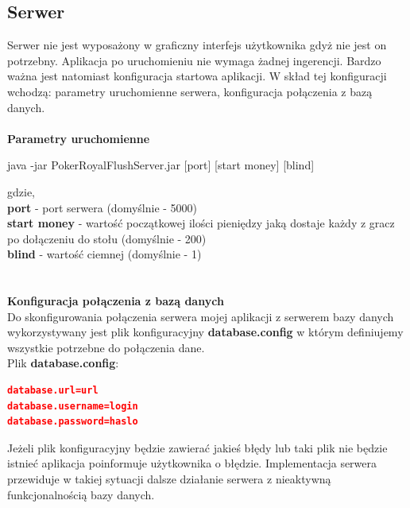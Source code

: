 \documentclass{article}
\begin{document}
    \subsection{Serwer}
        Serwer nie jest wyposażony w graficzny interfejs użytkownika gdyż nie jest on potrzebny.
        Aplikacja po uruchomieniu nie wymaga żadnej ingerencji.
        Bardzo ważna jest natomiast konfiguracja startowa aplikacji.
        W skład tej konfiguracji wchodzą: parametry uruchomienne serwera, konfiguracja połączenia z bazą danych.\\
        \\
        \textbf{Parametry uruchomienne}
            \begin{center}
                java -jar PokerRoyalFlushServer.jar [port] [start money] [blind]
            \end{center}
            gdzie,\\
            \textbf{port} - port serwera (domyślnie - 5000)\\
            \textbf{start money} - wartość początkowej ilości pieniędzy jaką dostaje każdy z gracz po dołączeniu do stołu (domyślnie - 200)\\
            \textbf{blind} - wartość ciemnej (domyślnie - 1)\\
        \\
        \\
        \textbf{Konfiguracja połączenia z bazą danych}\\
            Do skonfigurowania połączenia serwera mojej aplikacji z serwerem bazy danych wykorzystywany jest plik konfiguracyjny \textbf{database.config} w którym definiujemy wszystkie potrzebne do połączenia dane.\\
            Plik \textbf{database.config}:
            
            \begin{lstlisting}[language=json, firstnumber=1]
database.url=url
database.username=login
database.password=haslo
            \end{lstlisting}
            \vspace{2mm}
            
            Jeżeli plik konfiguracyjny będzie zawierać jakieś błędy lub taki plik nie będzie istnieć aplikacja poinformuje użytkownika o błędzie.
            Implementacja serwera przewiduje w takiej sytuacji dalsze działanie serwera z nieaktywną funkcjonalnością bazy danych.
\end{document}
